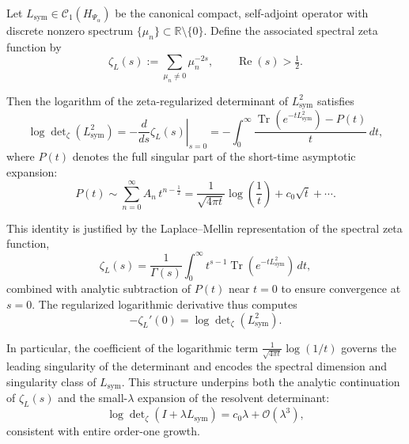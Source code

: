\begin{lemma}
\label{lem:log_derivative_determinant}
Let \( L_{\mathrm{sym}} \in \mathcal{C}_1(H_{\Psi_\alpha}) \) be the canonical compact, self-adjoint operator with discrete nonzero spectrum \( \{ \mu_n \} \subset \mathbb{R} \setminus \{0\} \). Define the associated spectral zeta function by
\[
\zeta_L(s) := \sum_{\mu_n \neq 0} \mu_n^{-2s}, \qquad \operatorname{Re}(s) > \tfrac{1}{2}.
\]

Then the logarithm of the zeta-regularized determinant of \( L_{\mathrm{sym}}^2 \) satisfies
\[
\log \det\nolimits_{\zeta}(L_{\mathrm{sym}}^2)
= -\left. \frac{d}{ds} \zeta_L(s) \right|_{s=0}
= -\int_0^\infty \frac{\operatorname{Tr}(e^{-t L_{\mathrm{sym}}^2}) - P(t)}{t} \, dt,
\]
where \( P(t) \) denotes the full singular part of the short-time asymptotic expansion:
\[
P(t) \sim \sum_{n=0}^\infty A_n\, t^{n - \frac{1}{2}} = \frac{1}{\sqrt{4\pi t}} \log\left( \frac{1}{t} \right) + c_0 \sqrt{t} + \cdots.
\]

\medskip
\noindent
This identity is justified by the Laplace–Mellin representation of the spectral zeta function,
\[
\zeta_L(s) = \frac{1}{\Gamma(s)} \int_0^\infty t^{s-1} \operatorname{Tr}(e^{-t L_{\mathrm{sym}}^2}) \, dt,
\]
combined with analytic subtraction of \( P(t) \) near \( t = 0 \) to ensure convergence at \( s = 0 \). The regularized logarithmic derivative thus computes
\[
-\zeta_L'(0) = \log \det\nolimits_\zeta(L_{\mathrm{sym}}^2).
\]

\medskip
\noindent
In particular, the coefficient of the logarithmic term \( \frac{1}{\sqrt{4\pi t}} \log(1/t) \) governs the leading singularity of the determinant and encodes the spectral dimension and singularity class of \( L_{\mathrm{sym}} \). This structure underpins both the analytic continuation of \( \zeta_L(s) \) and the small-\( \lambda \) expansion of the resolvent determinant:
\[
\log \det\nolimits_{\zeta}(I + \lambda L_{\mathrm{sym}}) = c_0 \lambda + \mathcal{O}(\lambda^3),
\]
consistent with entire order-one growth.
\end{lemma}
